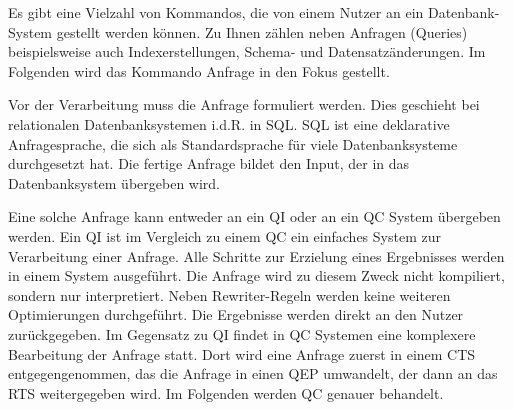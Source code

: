 Es gibt eine Vielzahl von Kommandos, die von einem Nutzer an ein Datenbank-System gestellt werden können. Zu Ihnen zählen neben Anfragen (Queries) beispielsweise auch Indexerstellungen, Schema- und Datensatzänderungen. Im Folgenden wird das Kommando Anfrage in den Fokus gestellt.

Vor der Verarbeitung muss die Anfrage formuliert werden. Dies geschieht bei relationalen Datenbanksystemen i.d.R. in \ac{SQL}. \ac{SQL} ist eine deklarative Anfragesprache, die sich als Standardsprache für viele Datenbanksysteme durchgesetzt hat. Die fertige Anfrage bildet den Input, der in das Datenbanksystem übergeben wird. 

Eine solche Anfrage kann entweder an ein \ac{QI} oder an ein \ac{QC} System übergeben werden. Ein \ac{QI} ist im Vergleich zu einem \ac{QC} ein einfaches System zur Verarbeitung einer Anfrage. Alle Schritte zur Erzielung eines Ergebnisses werden in einem System ausgeführt. Die Anfrage wird zu diesem Zweck nicht kompiliert, sondern nur interpretiert. Neben Rewriter-Regeln werden keine weiteren Optimierungen durchgeführt. Die Ergebnisse werden direkt an den Nutzer zurückgegeben. Im Gegensatz zu \ac{QI} findet in \ac{QC} Systemen eine komplexere Bearbeitung der Anfrage statt. Dort wird eine Anfrage zuerst in einem \ac{CTS} entgegengenommen, das die Anfrage in einen \ac{QEP} umwandelt, der dann an das \ac{RTS} weitergegeben wird. Im Folgenden werden \ac{QC} genauer behandelt.





